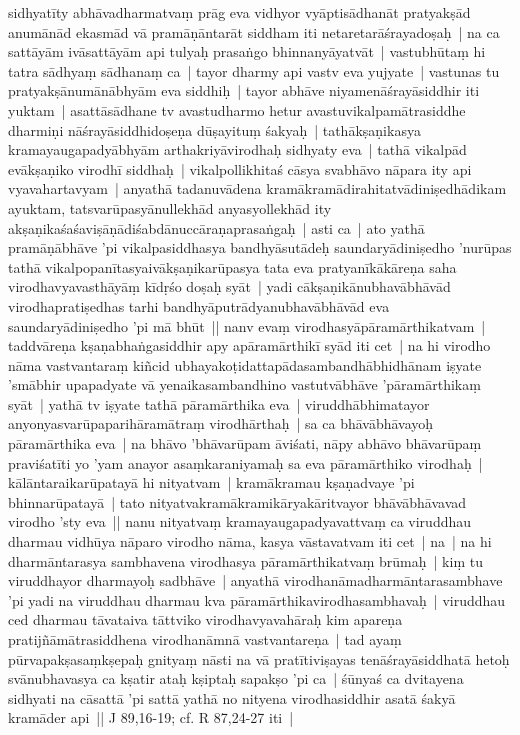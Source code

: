 \documentclass[article,a4paper]{memoir}
\begin{document}
sidhyatī\-ty abhā\-vadharmatvaṃ prā\-g eva vidhyor vyā\-ptisā\-dhanā\-t pratyakṣā\-d anumā\-nā\-d ekasmā\-d vā\- pramā\-ṇā\-ntarā\-t siddham iti netaretarā\-śrayadoṣaḥ | \label{thakur75-93.18} na ca sattā\-yā\-m ivā\-sattā\-yā\-m api tulyaḥ prasaṅgo bhinnanyā\-yatvā\-t | vastubhū\-taṃ hi tatra sā\-dhyaṃ sā\-dhanaṃ ca | tayor dharmy api vastv eva yujyate | \label{thakur75-93.19} vastunas tu pratyakṣā\-numā\-nā\-bhyā\-m eva siddhiḥ | tayor abhā\-ve niyamenā\-śrayā\-siddhir iti yuktam | asattā\-sā\-dhane tv avastudharmo hetur avastuvikalpamā\-trasiddhe dharmiṇi nā\-śrayā\-siddhidoṣeṇa dū\-ṣayituṃ śakyaḥ | tathā\-kṣaṇikasya kramayaugapadyā\-bhyā\-m arthakriyā\-virodhaḥ sidhyaty eva | \label{thakur75-93.22} tathā\- vikalpā\-d evā\-kṣaṇiko virodhī\- siddhaḥ | vikalpollikhitaś cā\-sya svabhā\-vo nā\-para ity api vyavahartavyam | anyathā\- tadanuvā\-dena kramā\-kramā\-dirahitatvā\-diniṣedhā\-dikam ayuktam, tatsvarū\-pasyā\-nullekhā\-d anyasyollekhā\-d ity akṣaṇikaśaśaviṣā\-ṇā\-diśabdā\-nuccā\-raṇaprasaṅgaḥ | asti ca | ato yathā\- pramā\-ṇā\-bhā\-ve 'pi vikalpasiddhasya bandhyā\-sutā\-deḥ saundaryā\-diniṣedho 'nurū\-pas tathā\- vikalpopanī\-tasyaivā\-kṣaṇikarū\-pasya tata eva pratyanī\-kā\-kā\-reṇa saha virodhavyavasthā\-yā\-ṃ kī\-dṛśo doṣaḥ syā\-t | yadi cā\-kṣaṇikā\-nubhavā\-bhā\-vā\-d virodhapratiṣedhas tarhi bandhyā\-putrā\-dyanubhavā\-bhā\-vā\-d eva saundaryā\-diniṣedho 'pi mā\- bhū\-t || \label{thakur75-94.5} nanv evaṃ virodhasyā\-pā\-ramā\-rthikatvam | taddvā\-reṇa kṣaṇabhaṅgasiddhir apy apā\-ramā\-rthikī\- syā\-d iti cet | \label{thakur75-94.6} na hi virodho nā\-ma vastvantaraṃ kiñcid ubhayakoṭidattapā\-dasambandhā\-bhidhā\-nam iṣyate 'smā\-bhir upapadyate vā\- yenaikasambandhino vastutvā\-bhā\-ve 'pā\-ramā\-rthikaṃ syā\-t | yathā\- tv iṣyate tathā\- pā\-ramā\-rthika eva | viruddhā\-bhimatayor anyonyasvarū\-paparihā\-ramā\-traṃ virodhā\-rthaḥ | sa ca bhā\-vā\-bhā\-vayoḥ pā\-ramā\-rthika eva | na bhā\-vo 'bhā\-varū\-pam ā\-viśati, nā\-py abhā\-vo bhā\-varū\-paṃ praviśatī\-ti yo 'yam anayor asaṃkaraniyamaḥ sa eva pā\-ramā\-rthiko virodhaḥ | kā\-lā\-ntaraikarū\-patayā\- hi nityatvam | kramā\-kramau kṣaṇadvaye 'pi bhinnarū\-patayā\- | tato nityatvakramā\-kramikā\-ryakā\-ritvayor bhā\-vā\-bhā\-vavad virodho 'sty eva || \label{thakur75-94.14} nanu nityatvaṃ kramayaugapadyavattvaṃ ca viruddhau dharmau vidhū\-ya nā\-paro virodho nā\-ma, kasya vā\-stavatvam iti cet | \label{thakur75-94.15} na | na hi dharmā\-ntarasya sambhavena virodhasya pā\-ramā\-rthikatvaṃ brū\-maḥ | kiṃ tu viruddhayor dharmayoḥ sadbhā\-ve | anyathā\- virodhanā\-madharmā\-ntarasambhave 'pi yadi na viruddhau dharmau kva pā\-ramā\-rthikavirodhasambhavaḥ | viruddhau ced dharmau tā\-vataiva tā\-ttviko virodhavyavahā\-raḥ kim apareṇa pratijñā\-mā\-trasiddhena virodhanā\-mnā\- vastvantareṇa | \label{thakur75-94.20} tad ayaṃ pū\-rvapakṣasaṃkṣepaḥ gnityaṃ nā\-sti na vā\- pratī\-tiviṣayas tenā\-śrayā\-siddhatā\- hetoḥ svā\-nubhavasya ca kṣatir ataḥ kṣiptaḥ sapakṣo 'pi ca | śū\-nyaś ca dvitayena sidhyati na cā\-sattā\- 'pi sattā\- yathā\- no nityena virodhasiddhir asatā\- śakyā\- kramā\-der api || J 89,16-19; cf. R 87,24-27 iti | 
\end{document}
